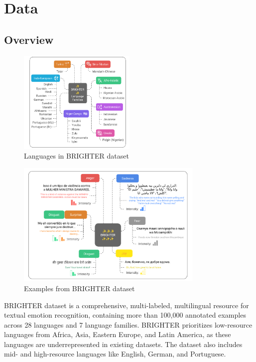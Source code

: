 \documentclass[a4paper,12pt]{extarticle}
\begin{document}
\section{Data}
\subsection{Overview}

\begin{figure}[h]
    \centering
    \includegraphics[width=0.5\textwidth]{brighter_languages.png}
    \caption{Languages in BRIGHTER dataset}
    \label{fig:brighter_languages}
\end{figure}

\begin{figure}[h]
    \centering
    \includegraphics[width=0.8\textwidth]{brighter_examples.png}
    \caption{Examples from BRIGHTER dataset}
    \label{fig:brighter_examples}
\end{figure}

BRIGHTER dataset \cite{muhammad2025brighterbridginggaphumanannotated} is a comprehensive, multi-labeled, multilingual resource for textual emotion recognition, containing more than 100,000 annotated examples across 28 languages and 7 language families. 
BRIGHTER prioritizes low-resource languages from Africa, Asia, Eastern Europe, and Latin America, as these languages are underrepresented in existing datasets.
The dataset also includes mid- and high-resource languages like English, German, and Portuguese.
\end{document}
